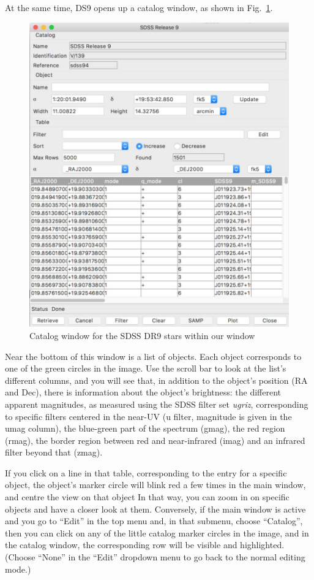 \documentclass[twocolumn,apj]{openjournal}
\begin{document}
At the same time, DS9 opens up a catalog window, as shown in Fig.~\ref{CatalogWindow}.
\begin{figure}[htbp]
\begin{center}
\includegraphics[width=\linewidth]{catalog-window.jpg}
\caption{Catalog window for the SDSS DR9 stars within our window}
\label{CatalogWindow}
\end{center}
\end{figure}
Near the bottom of this window is a list of objects. Each object corresponds to one of the green circles in the image. Use the scroll bar to look at the list's different columns, and you will see that, in addition to the object's position (RA and Dec), there is information about the object's brightness: the different apparent magnitudes, as measured using the SDSS filter set {\em ugriz}, corresponding to specific filters centered in the near-UV (u filter, magnitude is given in the umag column), the blue-green part of the spectrum (gmag), the red region (rmag), the border region between red and near-infrared (imag) and an infrared filter beyond that (zmag).

If you click on a line in that table, corresponding to the entry for a specific object, the object's marker circle will blink red a few times in the main window, and centre the view on that object In that way, you can zoom in on specific objects and have a closer look at them. Conversely, if the main window is active and you go to ``Edit'' in the top menu and, in that submenu, choose ``Catalog'', then you can click on any of the little catalog marker circles in the image, and in the catalog window, the corresponding row will be visible and highlighted. (Choose ``None'' in the ``Edit'' dropdown menu to go back to the normal editing mode.)
\end{document}
